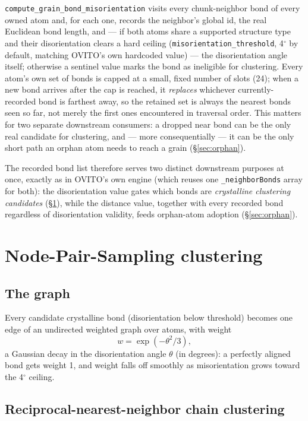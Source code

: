 \documentclass[11pt,a4paper]{article}
\newcommand{\op}[1]{\texttt{#1}}
\newcommand{\code}[1]{\texttt{#1}}
\begin{document}
\op{compute\_grain\_bond\_misorientation} visits every chunk-neighbor bond of every owned atom and,
for each one, records the neighbor's global id, the real Euclidean bond length, and — if both atoms
share a supported structure type and their disorientation clears a hard ceiling
(\code{misorientation\_threshold}, 4$^\circ$ by default, matching OVITO's own hardcoded value) —
the disorientation angle itself; otherwise a sentinel value marks the bond as ineligible for
clustering. Every atom's own set of bonds is capped at a small, fixed number of slots (24); when a
new bond arrives after the cap is reached, it \emph{replaces} whichever currently-recorded bond is
farthest away, so the retained set is always the nearest bonds seen so far, not merely the first
ones encountered in traversal order. This matters for two separate downstream consumers: a dropped
near bond can be the only real candidate for clustering, and — more consequentially — it can be the
only short path an orphan atom needs to reach a grain (\S\ref{sec:orphan}).

The recorded bond list therefore serves two distinct downstream purposes at once, exactly as in
OVITO's own engine (which reuses one \code{\_neighborBonds} array for both): the disorientation
value gates which bonds are \emph{crystalline clustering candidates} (\S\ref{sec:nps}), while the
distance value, together with every recorded bond regardless of disorientation validity, feeds
orphan-atom adoption (\S\ref{sec:orphan}).

\section{Node-Pair-Sampling clustering}
\label{sec:nps}

\subsection{The graph}

Every candidate crystalline bond (disorientation below threshold) becomes one edge of an undirected
weighted graph over atoms, with weight
\begin{equation}
  w = \exp\!\left(-\theta^2/3\right),
\end{equation}
a Gaussian decay in the disorientation angle $\theta$ (in degrees): a perfectly aligned bond gets
weight 1, and weight falls off smoothly as misorientation grows toward the 4$^\circ$ ceiling.

\subsection{Reciprocal-nearest-neighbor chain clustering}
\end{document}
